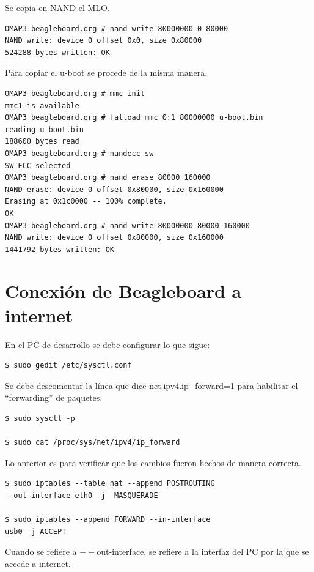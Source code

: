 Se copia en NAND el MLO.

\begin{verbatim}
OMAP3 beagleboard.org # nand write 80000000 0 80000 
NAND write: device 0 offset 0x0, size 0x80000 
524288 bytes written: OK 
\end{verbatim}

Para copiar el u-boot se procede de la misma manera.

\begin{verbatim}
OMAP3 beagleboard.org # mmc init 
mmc1 is available 
OMAP3 beagleboard.org # fatload mmc 0:1 80000000 u-boot.bin 
reading u-boot.bin 
188600 bytes read 
OMAP3 beagleboard.org # nandecc sw 
SW ECC selected 
OMAP3 beagleboard.org # nand erase 80000 160000 
NAND erase: device 0 offset 0x80000, size 0x160000 
Erasing at 0x1c0000 -- 100% complete. 
OK 
OMAP3 beagleboard.org # nand write 80000000 80000 160000 
NAND write: device 0 offset 0x80000, size 0x160000 
1441792 bytes written: OK
\end{verbatim}


\section{Conexión de Beagleboard a internet}\label{BbInternet}

\bigskip
En el PC de desarrollo se debe configurar lo que sigue:

\begin{verbatim}
$ sudo gedit /etc/sysctl.conf
\end{verbatim}

Se debe descomentar la línea que dice net.ipv4.ip\_forward=1 para habilitar el “forwarding” de paquetes.

\begin{verbatim}
$ sudo sysctl -p

$ sudo cat /proc/sys/net/ipv4/ip_forward
\end{verbatim}

Lo anterior es para verificar que los cambios fueron hechos de manera correcta.

\begin{verbatim}
$ sudo iptables --table nat --append POSTROUTING 
--out-interface eth0 -j  MASQUERADE

$ sudo iptables --append FORWARD --in-interface 
usb0 -j ACCEPT
\end{verbatim}

Cuando se refiere a $--$out-interface, se refiere a la interfaz del PC por la que se accede a internet.



